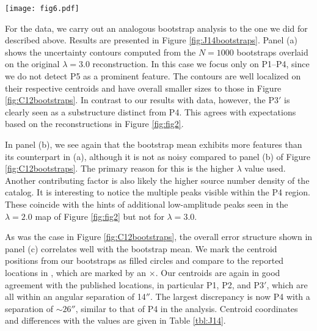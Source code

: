\documentclass[iop,twocolappendix]{emulateapj}
\newcommand{\cta}[1]{\citetalias{#1}}
\begin{document}
\begin{figure*}
\centering
\texttt{[image: fig6.pdf]}
\caption{Bootstrap analysis of \cta{J14} data with $\lambda=3.0$. Panels are analogous to those
         in Figure \ref{fig:C12bootstraps}. }
\label{fig:J14bootstraps}
\end{figure*}

For the \cta{J14} data, we carry out an analogous bootstrap analysis to the one we did for \cta{C12} described
above. Results are presented in Figure \ref{fig:J14bootstraps}. Panel (a) shows the uncertainty contours
computed from the $N=1000$ bootstraps overlaid on the original $\lambda=3.0$ reconstruction. In this
case we focus only on P1--P4, since we do not detect P5 as a prominent feature. The contours are well 
localized on their respective centroids and have overall smaller sizes to those in Figure 
\ref{fig:C12bootstraps}. In contrast to our results with \cta{C12} data, however, the P3$'$ is
clearly seen as a substructure distinct from P4. This agrees with expectations based on the
reconstructions in Figure \ref{fig:fig2}.

In panel (b), we see again that the bootstrap mean exhibits more features than its counterpart in 
(a), although it is not as noisy compared to panel (b) of Figure \ref{fig:C12bootstraps}. The primary
reason for this is the higher $\lambda$ value used. Another contributing factor is also likely 
the higher source number density of the \cta{J14} catalog. It is interesting to notice the multiple
peaks visible within the P4 region. These coincide with the hints of additional low-amplitude peaks
seen in the $\lambda=2.0$ map of Figure \ref{fig:fig2} but not for $\lambda=3.0$. 

As was the case in Figure \ref{fig:C12bootstraps}, the overall error structure shown in panel (c) 
correlates well with the bootstrap mean. We mark the centroid positions from our bootstraps as 
filled circles and compare to the reported locations in \cta{J14}, which are marked by an $\times$. 
Our centroids are again in good agreement with the published locations, in particular P1, P2, and 
P3$'$, which are all within an angular separation of 14$''$. The largest discrepancy is now P4 
with a separation of $\sim26''$, similar to that of P4 in the \cta{C12} analysis. Centroid
coordinates and differences with the \cta{J14} values are given in Table \ref{tbl:J14}.
\end{document}
